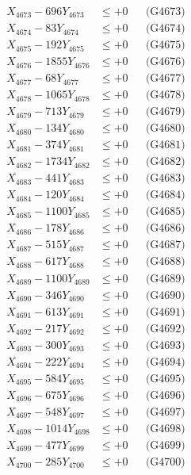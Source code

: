 \documentclass[a4paper,10pt]{article}
\begin{document}
{\begin{align}
X_{4673} - 696Y_{4673} &\leq +0 && \text{(G4673)} \\
X_{4674} - 83Y_{4674} &\leq +0 && \text{(G4674)} \\
X_{4675} - 192Y_{4675} &\leq +0 && \text{(G4675)} \\
X_{4676} - 1855Y_{4676} &\leq +0 && \text{(G4676)} \\
X_{4677} - 68Y_{4677} &\leq +0 && \text{(G4677)} \\
X_{4678} - 1065Y_{4678} &\leq +0 && \text{(G4678)} \\
X_{4679} - 713Y_{4679} &\leq +0 && \text{(G4679)} \\
X_{4680} - 134Y_{4680} &\leq +0 && \text{(G4680)} \\
\allowbreak
X_{4681} - 374Y_{4681} &\leq +0 && \text{(G4681)} \\
X_{4682} - 1734Y_{4682} &\leq +0 && \text{(G4682)} \\
X_{4683} - 441Y_{4683} &\leq +0 && \text{(G4683)} \\
X_{4684} - 120Y_{4684} &\leq +0 && \text{(G4684)} \\
X_{4685} - 1100Y_{4685} &\leq +0 && \text{(G4685)} \\
X_{4686} - 178Y_{4686} &\leq +0 && \text{(G4686)} \\
X_{4687} - 515Y_{4687} &\leq +0 && \text{(G4687)} \\
X_{4688} - 617Y_{4688} &\leq +0 && \text{(G4688)} \\
X_{4689} - 1100Y_{4689} &\leq +0 && \text{(G4689)} \\
X_{4690} - 346Y_{4690} &\leq +0 && \text{(G4690)} \\
\allowbreak
X_{4691} - 613Y_{4691} &\leq +0 && \text{(G4691)} \\
X_{4692} - 217Y_{4692} &\leq +0 && \text{(G4692)} \\
X_{4693} - 300Y_{4693} &\leq +0 && \text{(G4693)} \\
X_{4694} - 222Y_{4694} &\leq +0 && \text{(G4694)} \\
X_{4695} - 584Y_{4695} &\leq +0 && \text{(G4695)} \\
X_{4696} - 675Y_{4696} &\leq +0 && \text{(G4696)} \\
X_{4697} - 548Y_{4697} &\leq +0 && \text{(G4697)} \\
X_{4698} - 1014Y_{4698} &\leq +0 && \text{(G4698)} \\
X_{4699} - 477Y_{4699} &\leq +0 && \text{(G4699)} \\
X_{4700} - 285Y_{4700} &\leq +0 && \text{(G4700)} \\

\end{align}}
\end{document}
